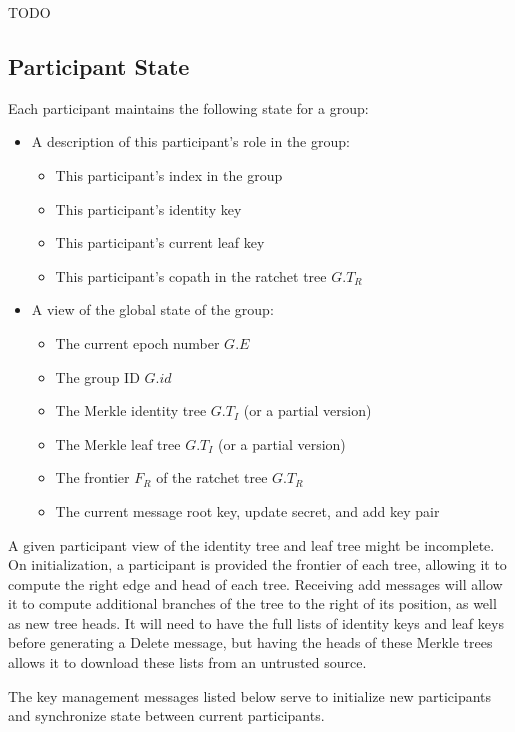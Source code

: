\documentclass[11pt, oneside]{article}
\begin{document}
TODO

\subsection{Participant State}

Each participant maintains the following state for a group:

\begin{itemize}
\item{A description of this participant's role in the group:
	\begin{itemize}
	\item{This participant's index in the group}
	\item{This participant's identity key}
	\item{This participant's current leaf key}
	\item{This participant's copath in the ratchet tree $G.T_R$}
	\end{itemize}
}
\item{A view of the global state of the group:
	\begin{itemize}
	\item{The current epoch number $G.E$}
	\item{The group ID $G.id$}
	\item{The Merkle identity tree $G.T_I$ (or a partial version)}
	\item{The Merkle leaf tree $G.T_I$ (or a partial version)}
	\item{The frontier $F_R$ of the ratchet tree $G.T_R$}
	\item{The current message root key, update secret, and add key pair}
	\end{itemize}
}
\end{itemize}

A given participant view of the identity tree and leaf tree might be incomplete.  On initialization, a participant is provided the frontier of each tree, allowing it to compute the right edge and head of each tree.  Receiving add messages will allow it to compute additional branches of the tree to the right of its position, as well as new tree heads.  It will need to have the full lists of identity keys and leaf keys before generating a Delete message, but having the heads of these Merkle trees allows it to download these lists from an untrusted source.

The key management messages listed below serve to initialize new participants and synchronize state between current participants.
\end{document}
